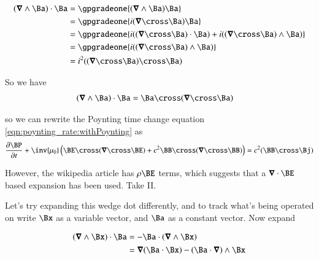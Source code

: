 \begin{align*}
(\spacegrad \wedge \Ba) \cdot \Ba
&= \gpgradeone{(\spacegrad \wedge \Ba) \Ba } \\
&= \gpgradeone{i (\spacegrad \cross \Ba) \Ba } \\
&= \gpgradeone{i ((\spacegrad \cross \Ba) \cdot \Ba) + i ((\spacegrad \cross \Ba) \wedge \Ba) } \\
&= \gpgradeone{i ((\spacegrad \cross \Ba) \wedge \Ba) } \\
&= i^2 ((\spacegrad \cross \Ba) \cross \Ba) \\
\end{align*}

So we have
\begin{align}
(\spacegrad \wedge \Ba) \cdot \Ba &= \Ba \cross (\spacegrad \cross \Ba)
\end{align}

so we can rewrite the Poynting time change equation \ref{eqn:poynting_rate:withPoynting} as
\begin{align}
\PD{t}{\BP} + \inv{\mu_0}
\left( \BE \cross (\spacegrad \cross \BE) + c^2 \BB \cross (\spacegrad \cross \BB) \right)
 = c^2 (\BB \cross \Bj)
\end{align}

However, the wikipedia article has $\rho \BE$ terms, which suggests that a $\spacegrad \cdot \BE$ based expansion has been used.  Take II.

Let's try expanding this wedge dot differently, and to track what's being operated on write $\Bx$ as a variable vector, and
$\Ba$ as a constant vector.  Now expand

\begin{align*}
(\spacegrad \wedge \Bx) \cdot \Ba
&= - \Ba \cdot (\spacegrad \wedge \Bx) \\
&= \spacegrad (\Ba \cdot \Bx) - (\Ba \cdot \spacegrad) \wedge \Bx \\
\end{align*}

